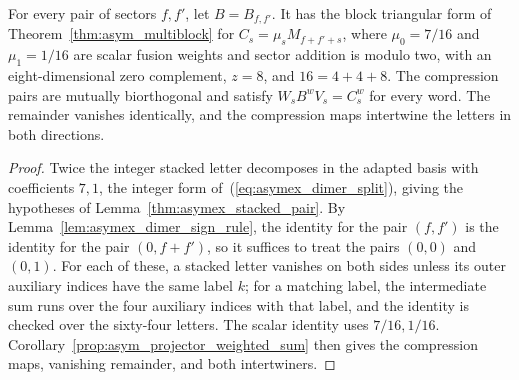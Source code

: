 \begin{lemma}
    \label{thm:asymex_dimer_compression}
    \leanok
    For every pair of sectors $f,f'$, let $B=B_{f,f'}$.
    It has the block triangular form of
    Theorem~\ref{thm:asym_multiblock} for $C_s=\mu_sM_{f+f'+s}$, where
    $\mu_0=7/16$ and $\mu_1=1/16$ are scalar fusion weights and sector
    addition is modulo two, with an
    eight-dimensional zero complement, $z=8$, and $16=4+4+8$.
    The compression pairs are mutually biorthogonal and satisfy
    $W_sB^wV_s=C_s^w$ for every word. The remainder vanishes
    identically, and the compression maps intertwine the letters in
    both directions.
\end{lemma}
\begin{proof}
    \leanok
    Twice the integer stacked letter decomposes in the adapted basis
    with coefficients $7,1$, the integer form
    of~(\ref{eq:asymex_dimer_split}), giving the hypotheses of
    Lemma~\ref{thm:asymex_stacked_pair}. By
    Lemma~\ref{lem:asymex_dimer_sign_rule}, the identity for the pair
    $(f,f')$ is the identity for the pair $(0,f+f')$, so it suffices to
    treat the pairs $(0,0)$ and $(0,1)$. For each of these, a stacked
    letter vanishes on both sides unless its outer auxiliary indices have
    the same label $k$; for a matching label, the intermediate sum runs
    over the four auxiliary indices with that label, and the identity is
    checked over the sixty-four letters. The scalar identity uses
    $7/16,1/16$.
    Corollary~\ref{prop:asym_projector_weighted_sum} then gives the
    compression maps, vanishing remainder, and both intertwiners.
\end{proof}

